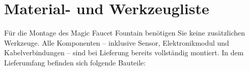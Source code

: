 %
%
%

\chapter{Material- und Werkzeugliste}
Für die Montage des Magic Faucet Fountain benötigen Sie keine zusätzlichen Werkzeuge. Alle Komponenten – inklusive Sensor, Elektronikmodul und Kabelverbindungen – sind bei Lieferung bereits vollständig montiert.
In dem Lieferumfang befinden sich folgende Bauteile:
